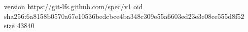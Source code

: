 version https://git-lfs.github.com/spec/v1
oid sha256:6a8158b0570a67e10536bedcbce4ba348c309e55a6603ed23e3e08ce555d8f52
size 43840
